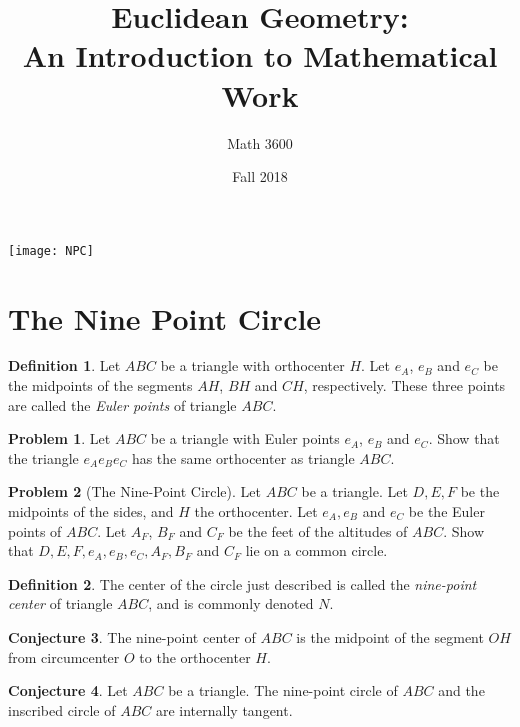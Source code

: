 \documentclass{tufte-handout}
\title{Euclidean Geometry:\\An Introduction to Mathematical Work}
\author[]{Math 3600}
\date{Fall 2018}
\theoremstyle{definition}
\newtheorem{problem}{Problem}[section]
\newtheorem{conjecture}[problem]{Conjecture}
\newtheorem*{definition}{Definition}
\begin{document}
\maketitle

\begin{marginfigure}
    \texttt{[image: NPC]}
\end{marginfigure}

\setcounter{section}{18}
\section{The Nine Point Circle}


\begin{definition} Let $ABC$ be a triangle with orthocenter $H$. Let $e_A$, $e_B$ and $e_C$ be the midpoints of the segments $AH$, $BH$ and $CH$, respectively. These three points are called the \emph{Euler points} of triangle $ABC$.
\end{definition}

\begin{problem} Let $ABC$ be a triangle with Euler points $e_A$, $e_B$ and $e_C$. Show that the triangle $e_A e_B e_C$ has the same orthocenter as triangle $ABC$.
\end{problem}

\begin{problem}[The Nine-Point Circle]\label{prob:nine-pt-circle}
Let $ABC$ be a triangle. Let $D, E, F$ be the midpoints of the sides, and $H$ the orthocenter. Let $e_A, e_B$ and $e_C$ be the Euler points of $ABC$. Let $A_F$, $B_F$ and $C_F$ be the feet of the altitudes of $ABC$. Show that $D, E, F, e_A, e_B, e_C, A_F, B_F$ and $C_F$ lie on a common circle.
\end{problem}



\begin{definition} The center of the circle just described is called the \emph{nine-point center} of triangle $ABC$, and is commonly denoted $N$.
\end{definition}

\begin{conjecture} The nine-point center of $ABC$ is the midpoint of the segment $OH$ from circumcenter $O$ to the orthocenter $H$.
\end{conjecture}

\begin{conjecture} Let $ABC$ be a triangle. The nine-point circle of $ABC$ and the inscribed circle of $ABC$ are internally tangent.
\end{conjecture}

\vfill
\end{document}
